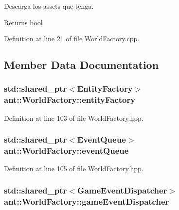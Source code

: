 Descarga los assets que tenga. 

\begin{DoxyReturn}{Returns}
bool 
\end{DoxyReturn}


Definition at line 21 of file World\+Factory.\+cpp.



\subsection{Member Data Documentation}
\hypertarget{classant_1_1_world_factory_a62f10340d3a942b982eff864e7d14225}{
\subsubsection[{entity\+Factory}]{\setlength{\rightskip}{0pt plus 5cm}std\+::shared\+\_\+ptr$<${\bf Entity\+Factory}$>$ ant\+::\+World\+Factory\+::entity\+Factory\hspace{0.3cm}{\ttfamily [private]}}}\label{classant_1_1_world_factory_a62f10340d3a942b982eff864e7d14225}


Definition at line 103 of file World\+Factory.\+hpp.

\hypertarget{classant_1_1_world_factory_ab68b50b1af9f4081f9ca0a3f21905168}{
\subsubsection[{event\+Queue}]{\setlength{\rightskip}{0pt plus 5cm}std\+::shared\+\_\+ptr$<${\bf Event\+Queue}$>$ ant\+::\+World\+Factory\+::event\+Queue\hspace{0.3cm}{\ttfamily [private]}}}\label{classant_1_1_world_factory_ab68b50b1af9f4081f9ca0a3f21905168}


Definition at line 105 of file World\+Factory.\+hpp.

\hypertarget{classant_1_1_world_factory_ad340f4243d30794bd46fd87c3ccd7075}{
\subsubsection[{game\+Event\+Dispatcher}]{\setlength{\rightskip}{0pt plus 5cm}std\+::shared\+\_\+ptr$<${\bf Game\+Event\+Dispatcher}$>$ ant\+::\+World\+Factory\+::game\+Event\+Dispatcher\hspace{0.3cm}{\ttfamily [private]}}}\label{classant_1_1_world_factory_ad340f4243d30794bd46fd87c3ccd7075}


